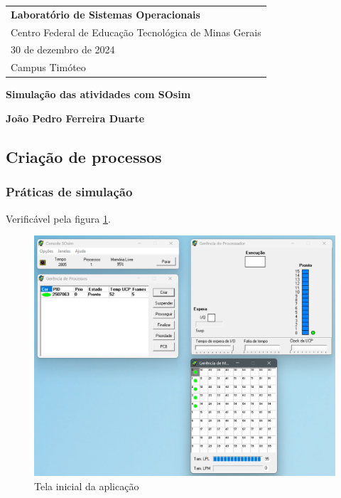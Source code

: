 \documentclass[a4paper,12pt]{article} %
\begin{document}

\thispagestyle{empty} %

\begin{tabular}{p{\textwidth}}
{\large \textbf{Laboratório de Sistemas Operacionais}} \\
Centro Federal de Educação Tecnológica de Minas Gerais \\
30 de dezembro de 2024 \\ Campus Timóteo \\
\hline
\end{tabular}

\vspace*{0.3cm}

\begin{center}
    {\Large \textbf{Simulação das atividades com SOsim}}
    \vspace{2mm}
    
    {\textbf{João Pedro Ferreira Duarte}}
\end{center}
\vspace{0.4cm}

\subsection[]{Criação de processos}
\subsubsection[]{Práticas de simulação}
Verificável pela figura \ref{fig1}.
\begin{figure}[htbp]
    \centering
    \includegraphics[scale=0.4]{../fig/fig1.png}
    \caption{Tela inicial da aplicação}
    \label{fig1}
\end{figure}
\end{document}

